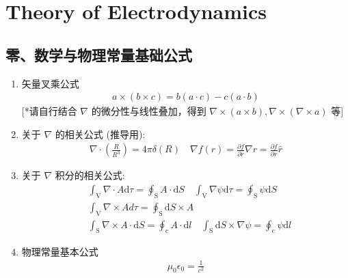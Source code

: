 \documentclass[../../note.tex]{subfiles}
\begin{document}
\chapter{Theory of Electrodynamics}
	\section{零、数学与物理常量基础公式}
	\begin{enumerate}
		\item 矢量叉乘公式
		\begin{align}
		a \times(b \times c)=b(a \cdot c)-c(a \cdot b)
		\end{align}
		[*请自行结合 $\nabla$ 的微分性与线性叠加，得到 $\nabla \times(a \times b), \nabla \times(\nabla \times a)$ 等]
		\item 关于 $\nabla$ 的相关公式 (推导用):
		\begin{align}
		\nabla \cdot\left(\frac{R}{R^3}\right)=4 \pi \delta(R) \quad \nabla f(r)=\frac{\partial f}{\partial r} \nabla r=\frac{\partial f}{\partial r} \hat{r}
		\end{align}
		\item 关于 $\nabla$ 积分的相关公式:
		\begin{align}
			& \int_{\mathrm{V}} \nabla \cdot {A} \mathrm{d} \tau=\oint_{\mathrm{S}} {A} \cdot \mathrm{d} {S} \quad \int_{\mathrm{V}} \nabla \psi \mathrm{d} \tau=\oint_{\mathrm{S}} \psi \mathrm{d} S \\
			& \int_{\mathrm{V}} \nabla \times {A} d \tau=\oint_{\mathrm{S}} \mathrm{d} {S} \times {A} \\
			& \int_{\mathrm{S}} \nabla \times {A} \cdot \mathrm{d} {S}=\oint_{\mathrm{c}} {A} \cdot \mathrm{d} {l} \quad \int_{\mathrm{S}} \mathrm{d} {S} \times \nabla \psi=\oint_{\mathrm{c}} \psi \mathrm{d} {l}
		\end{align}
		\item 物理常量基本公式
		\begin{align}
		\mu_0 \epsilon_0=\frac{1}{c^2}
		\end{align}
	\end{enumerate}
\end{document}
